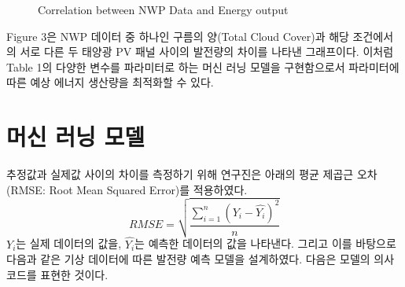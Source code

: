 \documentclass{article}
\begin{document}
\begin{figure}[!h]
\centering
{}
\caption{Correlation between NWP Data and Energy output}
\label{fig_3}
\end{figure}

Figure 3은 NWP 데이터 중 하나인 구름의 양(Total Cloud Cover)과 해당 조건에서의 서로 다른 두 태양광 PV 패널 사이의 발전량의 차이를 나타낸 그래프이다. 이처럼 Table 1의 다양한 변수를 파라미터로 하는 머신 러닝 모델을 구현함으로서 파라미터에 따른 예상 에너지 생산량을 최적화할 수 있다.

\section{머신 러닝 모델}
추정값과 실제값 사이의 차이를 측정하기 위해 연구진은 아래의 평균 제곱근 오차(RMSE: Root Mean Squared Error)를 적용하였다.
\begin{equation}
RMSE=\sqrt{\frac{\sum_{i=1}^{n}(Y_i-\hat{Y_i})^2}{n}}
\end{equation}
$Y_i$는 실제 데이터의 값을, $\hat{Y_i}$는 예측한 데이터의 값을 나타낸다.
그리고 이를 바탕으로 다음과 같은 기상 데이터에 따른 발전량 예측 모델을 설계하였다. 다음은 모델의 의사코드를 표현한 것이다.
\end{document}
